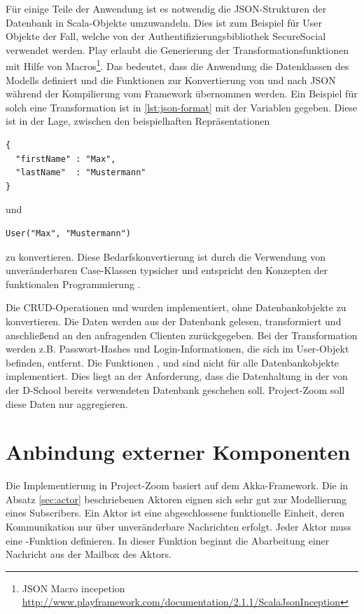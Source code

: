 

Für einige Teile der Anwendung ist es notwendig die JSON-Strukturen der Datenbank in Scala-Objekte umzuwandeln. Dies ist zum Beispiel für User Objekte der Fall, welche von der Authentifizierungsbibliothek SecureSocial verwendet werden. Play erlaubt die Generierung der Transformationsfunktionen mit Hilfe von Macros\footnote{JSON Macro incepetion \url{http://www.playframework.com/documentation/2.1.1/ScalaJsonInception}}. Das bedeutet, dass die Anwendung die Datenklassen des Modells definiert und die Funktionen zur Konvertierung von und nach JSON während der Kompilierung vom Framework übernommen werden. Ein Beispiel für solch eine Transformation ist in \ref{lst:json-format} mit der Variablen  gegeben. Diese ist in der Lage, zwischen den beispielhaften Repräsentationen 
\begin{lstlisting} 
{ 
  "firstName" : "Max", 
  "lastName"  : "Mustermann" 
}
\end{lstlisting} und 
\begin{lstlisting} 
User("Max", "Mustermann")
\end{lstlisting} 
zu konvertieren. Diese Bedarfskonvertierung ist durch die Verwendung von unveränderbaren Case-Klassen typsicher und entspricht den Konzepten der funktionalen Programmierung \cite{functional-thinking}.

Die CRUD-Operationen  und  wurden implementiert, ohne Datenbankobjekte zu konvertieren. Die Daten werden aus der Datenbank gelesen, transformiert und anschließend an den anfragenden Clienten zurückgegeben. Bei der Transformation werden z.B. Passwort-Hashes und Login-Informationen, die sich im User-Objekt befinden, entfernt. Die Funktionen ,  und  sind nicht für alle Datenbankobjekte implementiert. Dies liegt an der Anforderung, dass die Datenhaltung in der von der D-School bereits verwendeten Datenbank geschehen soll. Project-Zoom soll diese Daten nur aggregieren.


\section{Anbindung externer Komponenten}

Die Implementierung in Project-Zoom basiert auf dem Akka-Framework. Die in Absatz \ref{sec:actor} beschriebenen Aktoren eignen sich sehr gut zur Modellierung eines Subscribers. Ein Aktor ist eine abgeschlossene funktionelle Einheit, deren Kommunikation nur über unveränderbare Nachrichten erfolgt. Jeder Aktor muss eine -Funktion definieren. In dieser Funktion beginnt die Abarbeitung einer Nachricht aus der Mailbox des Aktors. 

